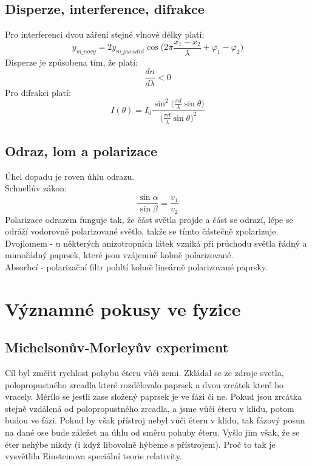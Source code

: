 \documentclass[titlepage]{report}
\begin{document}
\section{Disperze, interference, difrakce}
Pro interferenci dvou záření stejné vlnové délky platí:\\
\begin{equation}
y_{m\_novy} = 2 y_{m\_puvodni} \cos \Big ( 2\pi \frac{x_1 - x_2}{\lambda} + \varphi_1 - \varphi_2 \Big )
\end{equation}
Disperze je způsobena tím, že platí:\\
\begin{equation}
\frac{dn}{d\lambda} < 0
\end{equation}
Pro difrakci platí:\\
\begin{equation}
I(\theta) = I_0 \frac{\sin^2 \Big ( \frac{\pi d}{\lambda} \sin \theta \Big )}{\Big ( \frac{\pi d}{\lambda} \sin \theta \Big )^2}
\end{equation}
\section{Odraz, lom a polarizace}
Úhel dopadu je roven úhlu odrazu.\\
Schnellův zákon:\\
\begin{equation}
\frac{\sin \alpha}{\sin \beta} = \frac{v_1}{v_2}
\end{equation}
Polarizace odrazem funguje tak, že část světla projde a část se odrazí, lépe se odráží vodorovně polarizované světlo, takže se tímto částečně zpolarizuje.\\
Dvojlomem - u některých anizotropních látek vzniká při průchodu světla řádný a mimořádný paprsek, které jsou vzájemně kolmě polarizované.\\
Absorbcí - polarizační filtr pohltí kolmě lineárně polarizované paprsky.
\chapter{Významné pokusy ve fyzice}
\section{Michelsonův-Morleyův experiment}
Cíl byl změřit rychlost pohybu éteru vůči zemi. Zkládal se ze zdroje svetla, polopropustného zrcadla které rozdělovalo paprsek a dvou zrcátek které ho vracely. Mérílo se jestli zase složený paprsek je ve fázi či ne. Pokud jsou zrcátka stejně vzdálená od polopropustného zrcadla, a jsme vůči éteru v klidu, potom budou ve fázi. Pokud by však přístroj nebyl vůči éteru v klidu, tak fázový posun na dané ose bude záležet na úhlu od směru pohuby éteru. Vyšlo jim však, že se éter nehýbe nikdy (i když libovolně hýbeme s přístrojem). Proč to tak je vysvětlila Einsteinova speciální teorie relativity.
\end{document}
